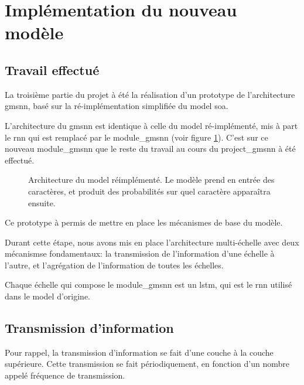 \section{Implémentation du nouveau modèle}
\subsection{Travail effectué}\label{def:lstm_2}
La troisième partie du projet à été la réalisation d'un prototype de l'architecture \gls{gmsnn}, basé sur la ré-implémentation simplifiée du \gls{model} \gls{soa}.

L'architecture du \gls{gmsnn} est identique à celle du \gls{model} ré-implémenté, mis à part le \gls{rnn} qui est remplacé par le \gls{module_gmsnn} (voir figure \ref{fig:reimplement_gmsnn}). C'est sur ce nouveau \gls{module_gmsnn} que le reste du travail au cours du \gls{project_gmsnn} à été effectué.

\begin{figure}[ht]
	\centering
	\scalebox{1}{}
	\caption[Architecture du  réimplémenté]{Architecture du \gls{model} réimplémenté. Le modèle prend en entrée des caractères, et produit des probabilités sur quel caractère apparaîtra ensuite.}\label{fig:reimplement_gmsnn}
\end{figure}

Ce prototype à permis de mettre en place les mécanismes de base du modèle.

Durant cette étape, nous avons mis en place l'architecture multi-échelle avec deux mécanismse fondamentaux: la transmission de l'information d'une échelle à l'autre, et l'agrégation de l'information de toutes les échelles.

Chaque échelle qui compose le \gls{module_gmsnn} est un \gls{lstm}, qui est le \gls{rnn} utilisé dans le \gls{model} d'origine. 

\subsection{Transmission d'information}
Pour rappel, la transmission d'information se fait d'une couche à la couche supérieure.
Cette transmission se fait périodiquement, en fonction d'un nombre appelé fréquence de transmission.
%

